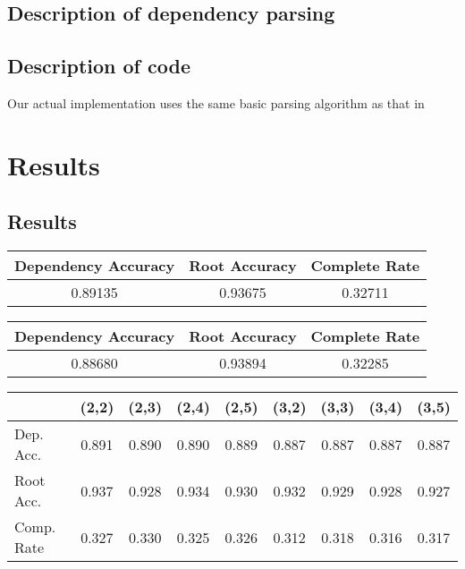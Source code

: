 \documentclass[12pt,fleqn]{article}
\begin{document}
\subsection{Description of dependency parsing}
\subsection{Description of code}
Our actual implementation uses the same basic parsing algorithm as that in 
\cite{original}

\section{Results}
\subsection{Results}

    \begin{center}
        \begin{tabular}{|c|c|c|}
            \hline Dependency Accuracy & Root Accuracy & Complete Rate \\ \hline
            0.89135 & 0.93675 & 0.32711 \\ \hline
        \end{tabular}
    \end{center}

    \begin{center}
        \begin{tabular}{|c|c|c|}
            \hline Dependency Accuracy & Root Accuracy & Complete Rate \\ \hline
            0.88680 & 0.93894 & 0.32285 \\ \hline
        \end{tabular}
    \end{center}


    \begin{center}
        \begin{tabular}{|l|cccc|cccc|}
            \cline{2-9} \multicolumn{1}{c|}{} & (2,2) & (2,3) & (2,4) & (2,5) & (3,2) & (3,3) & (3,4) & (3,5) \\ \hline
            Dep. Acc. & 0.891 & 0.890 & 0.890 & 0.889 & 0.887 & 0.887 & 0.887 & 0.887 \\
            Root Acc. & 0.937 & 0.928 & 0.934 & 0.930 & 0.932 & 0.929 & 0.928 & 0.927 \\
            Comp. Rate & 0.327 & 0.330 & 0.325 & 0.326 & 0.312 & 0.318 & 0.316 & 0.317 \\ \hline
        \end{tabular}
    \end{center}
\end{document}
